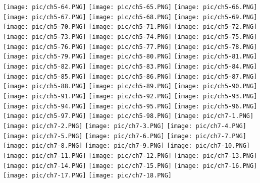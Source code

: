 \documentclass[UTF-8]{ctexart}
\begin{document}
\begin{center}
    \texttt{[image: pic/ch5-64.PNG]}
    \texttt{[image: pic/ch5-65.PNG]}
    \texttt{[image: pic/ch5-66.PNG]}
    \texttt{[image: pic/ch5-67.PNG]}
    \texttt{[image: pic/ch5-68.PNG]}
    \texttt{[image: pic/ch5-69.PNG]}
    \texttt{[image: pic/ch5-70.PNG]}
    \texttt{[image: pic/ch5-71.PNG]}
    \texttt{[image: pic/ch5-72.PNG]}
    \texttt{[image: pic/ch5-73.PNG]}
    \texttt{[image: pic/ch5-74.PNG]}
    \texttt{[image: pic/ch5-75.PNG]}
    \texttt{[image: pic/ch5-76.PNG]}
    \texttt{[image: pic/ch5-77.PNG]}
    \texttt{[image: pic/ch5-78.PNG]}
    \texttt{[image: pic/ch5-79.PNG]}
    \texttt{[image: pic/ch5-80.PNG]}
    \texttt{[image: pic/ch5-81.PNG]}
    \texttt{[image: pic/ch5-82.PNG]}
    \texttt{[image: pic/ch5-83.PNG]}
    \texttt{[image: pic/ch5-84.PNG]}
    \texttt{[image: pic/ch5-85.PNG]}
    \texttt{[image: pic/ch5-86.PNG]}
    \texttt{[image: pic/ch5-87.PNG]}
    \texttt{[image: pic/ch5-88.PNG]}
    \texttt{[image: pic/ch5-89.PNG]}
    \texttt{[image: pic/ch5-90.PNG]}
    \texttt{[image: pic/ch5-91.PNG]}
    \texttt{[image: pic/ch5-92.PNG]}
    \texttt{[image: pic/ch5-93.PNG]}
    \texttt{[image: pic/ch5-94.PNG]}
    \texttt{[image: pic/ch5-95.PNG]}
    \texttt{[image: pic/ch5-96.PNG]}
    \texttt{[image: pic/ch5-97.PNG]}
    \texttt{[image: pic/ch5-98.PNG]}
    \newpage
    \texttt{[image: pic/ch7-1.PNG]}
    \texttt{[image: pic/ch7-2.PNG]} 
    \texttt{[image: pic/ch7-3.PNG]} 
    \texttt{[image: pic/ch7-4.PNG]} 
    \texttt{[image: pic/ch7-5.PNG]} 
    \texttt{[image: pic/ch7-6.PNG]} 
    \texttt{[image: pic/ch7-7.PNG]} 
    \texttt{[image: pic/ch7-8.PNG]} 
    \texttt{[image: pic/ch7-9.PNG]} 
    \texttt{[image: pic/ch7-10.PNG]}
    \texttt{[image: pic/ch7-11.PNG]}
    \texttt{[image: pic/ch7-12.PNG]}
    \texttt{[image: pic/ch7-13.PNG]}
    \texttt{[image: pic/ch7-14.PNG]}
    \texttt{[image: pic/ch7-15.PNG]}
    \texttt{[image: pic/ch7-16.PNG]}
    \texttt{[image: pic/ch7-17.PNG]}
    \texttt{[image: pic/ch7-18.PNG]}

\end{center}
\end{document}
